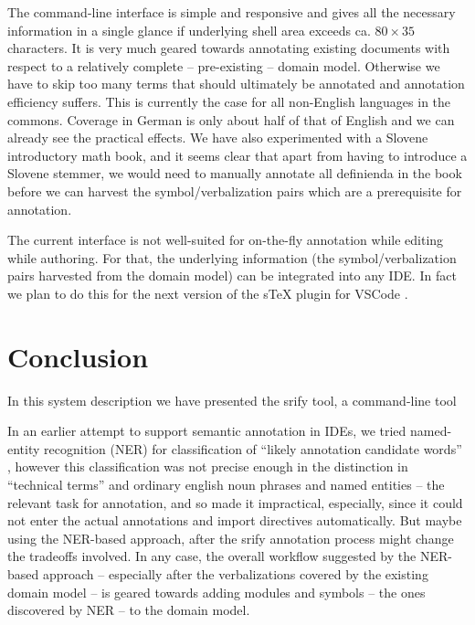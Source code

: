 \documentclass{llncs}
\newcommand\srf{\textsf{srify}\xspace}
\begin{document}
The command-line interface is simple and responsive and gives all the necessary
information in a single glance if underlying shell area exceeds ca. $80\times 35$
characters. It is very much geared towards annotating existing documents with respect to a
relatively complete -- pre-existing -- domain model. Otherwise we have to skip too many
terms that should ultimately be annotated and annotation efficiency suffers. This is
currently the case for all non-English languages in the \sTeX commons. Coverage in German
is only about half of that of English and we can already see the practical effects. We
have also experimented with a Slovene introductory math book, and it seems clear that
apart from having to introduce a Slovene stemmer, we would need to manually annotate all
definienda in the book before we can harvest the symbol/verbalization pairs which are a
prerequisite for annotation.

The current interface is not well-suited for on-the-fly annotation while editing while
authoring. For that, the underlying information (the symbol/verbalization pairs harvested
from the domain model) can be integrated into any IDE. In fact we plan to do this for the
next version of the sTeX plugin for VSCode \cite{sTeX-IDE:git}.


\section{Conclusion}

In this system description we have presented the \srf tool, a command-line tool

In an earlier attempt to support semantic annotation in IDEs, we tried named-entity
recognition (NER) for classification of ``likely annotation candidate words''
\cite{hutterer:msc23}, however this classification was not precise enough in the
distinction in ``technical terms'' and ordinary english noun phrases and named entities --
the relevant task for annotation, and so made it impractical, especially, since it could
not enter the actual annotations and import directives automatically. But maybe using the
NER-based approach, after the \srf annotation process might change the tradeoffs
involved. In any case, the overall workflow suggested by the NER-based approach --
especially after the verbalizations covered by the existing domain model -- is geared towards adding modules and symbols -- the ones discovered by NER
-- to the domain model. 



\printbibliography
\end{document}
